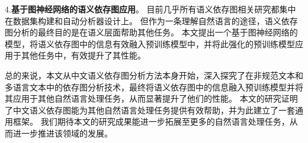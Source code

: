 \begin{cabstract}
4.\textbf{基于图神经网络的语义依存图应用}。
目前几乎所有语义依存图相关研究都集中在数据集构建和自动分析器设计上。
但作为一条理解自然语言的途径，语义依存图分析的最终目的是在语义层面帮助其他任务。
本文提出一个基于图神经网络的模型，将语义依存图中的信息有效融入预训练模型中，并将此强化的预训练模型应用于其他任务中，有效提升了其性能。

总的来说，本文从中文语义依存图分析方法本身开始，深入探究了在非规范文本和多语言文本中的依存图分析技术，最终将语义依存图中的信息融入预训练模型并将其应用于其他自然语言处理任务，从而显著提升了他们的性能。
本文的研究证明了中文语义依存图能为其他自然语言处理任务提供有效帮助，并为此建立了一套通用框架。
我们期待本文的研究成果能进一步拓展至更多的自然语言处理任务，从而进一步推进该领域的发展。

\end{cabstract}

